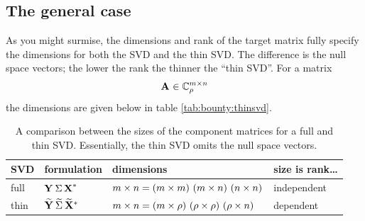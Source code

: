\subsection{The general case}
As you might surmise, the dimensions and rank of the target matrix fully specify the dimensions for both the SVD and the thin SVD. The difference is the null space vectors; the lower the rank the thinner the ``thin SVD''. For a matrix 
\begin{equation}
  \textbf{A}^{\mathrm{}}\in \mathbb{C}^{m \times n}_{\rho}
\end{equation}
the dimensions are given below in table \eqref{tab:bounty:thinsvd}.

\begin{table}[htdp]
\begin{center}
\begin{tabular}{llll}
SVD\quad & formulation & dimensions & size is rank\dots \\\hline
full & $\textbf{Y}^{\mathrm{}}\, \Sigma \, \textbf{X}^{\mathrm{ \mathrm{*} }}$ & $m \times n = \left( m \times m \right)\,\left( m \times n \right)\,\left( n \times n \right)$ & independent \\
thin & $\widetilde{\textbf{Y}^{\mathrm{}}}\, \widetilde{\Sigma^{\mathrm{}}}\, \widetilde{\mathbf{X}}^{\mathrm{*}}$ & $m \times n = \left( m \times \rho \right)\,\left( \rho \times \rho \right)\,\left( \rho \times n \right)$ & dependent \\[10pt]
\end{tabular}
\end{center}
\label{tab:bounty:thinsvd}
\caption{A comparison between the sizes of the component matrices for a full and thin SVD. Essentially, the thin SVD omits the null space vectors.}
\end{table}%

\endinput